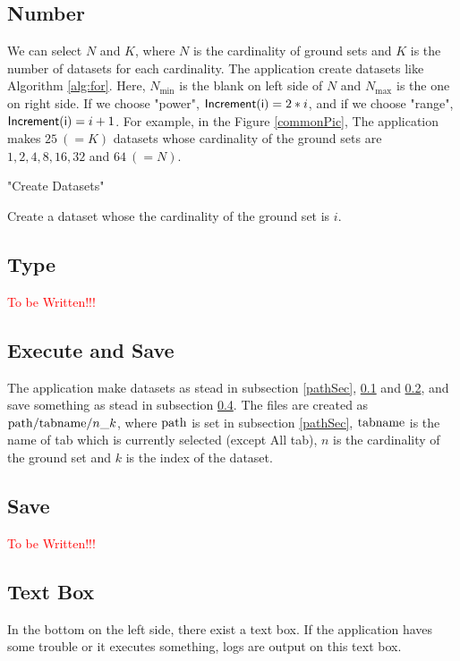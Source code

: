 \documentclass{article}
\begin{document}
\subsection{Number}\label{numberSec}
We can select $N$ and $K$,
where $N$ is the cardinality of ground sets
and $K$ is the number of datasets for each cardinality.
The application create datasets like Algorithm \ref{alg:for}.
Here, $N_{\min}$ is the blank on left side of $N$
and $N_{\max}$ is the one on right side.
If we choose "power", ${\sf Increment(i)}=2*i$,
and if we choose "range", ${\sf Increment(i)}=i+1$.
For example, in the Figure \ref*{commonPic},
The application makes $25 ~ (=K)$ datasets whose cardinality of the ground sets are $1,2,4,8,16,32$ and $64 ~ (=N)$.



\begin{algorithm}[h!]
\fontsize{10pt}{12.0pt}\selectfont
   \caption{"Create Datasets"}
   \label{alg:for}
\begin{algorithmic}
   \STATE Create a dataset whose the cardinality of the ground set is $i$.
   \ENDFOR
   \ENDFOR
\end{algorithmic}
\end{algorithm}

\subsection{Type}\label{typeSec}
\textcolor{red}{To be Written!!!}


\subsection{Execute and Save}
The application make datasets as stead in subsection \ref{pathSec}, \ref{numberSec} and \ref{typeSec},
and save something as stead in subsection \ref{saveSec}.
The files are created as ${\rm path}/{\rm tabname}/n\_k$,
where ${\rm path}$ is set in subsection \ref{pathSec},
${\rm tabname}$ is the name of tab which is currently selected (except All tab),
$n$ is the cardinality of the ground set
and $k$ is the index of the dataset.


\subsection{Save}\label{saveSec}
\textcolor{red}{To be Written!!!}

\subsection{Text Box}
In the bottom on the left side, there exist a text box.
If the application haves some trouble or 
it executes something,
logs are output on this text box.
\end{document}
